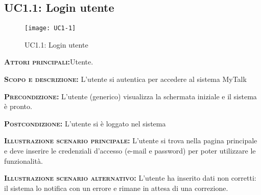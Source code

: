 \subsection{UC1.1: Login utente}
\begin{figure}[h!]
\centering
\texttt{[image: UC1-1]}
\caption{UC1.1: Login utente}\label{UC1.1}
\end{figure}
\begin{description}
\item{\scshape\bfseries Attori principali:}Utente.
\item{\scshape\bfseries Scopo e descrizione:} L'utente si autentica per accedere al sistema MyTalk
\item{\scshape\bfseries Precondizione:} L'utente (generico) visualizza la schermata iniziale e il sistema è pronto.
\item{\scshape\bfseries Postcondizione:} L'utente si è loggato nel sistema
\item{\scshape\bfseries Illustrazione scenario principale:} L'utente si trova nella pagina principale e deve inserire le credenziali d'accesso (e-mail e password) per poter utilizzare le funzionalità.
\item{\scshape\bfseries Illustrazione scenario alternativo:} L'utente ha inserito dati non corretti: il sistema lo notifica con un errore e rimane in attesa di una correzione.
\end{description}

